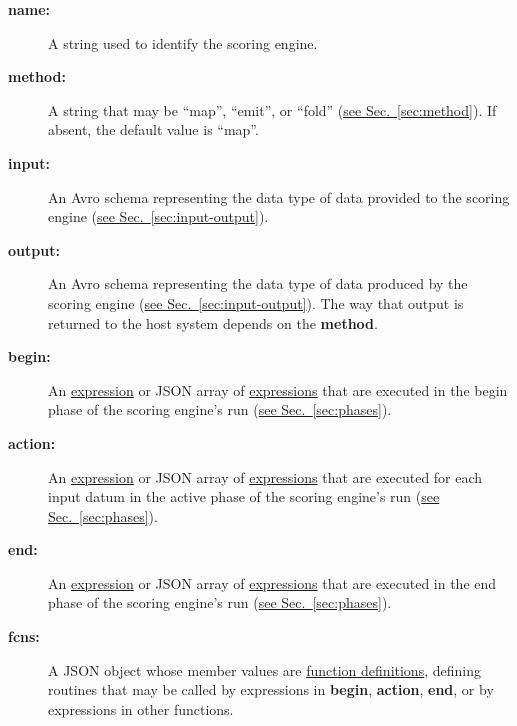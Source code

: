 \documentclass{article}
\newcommand{\PFAc}{\ttfamily\bfseries}
\newenvironment{allowedfields}%
  {\begin{center} \begin{minipage}{0.9\linewidth} \begin{description}}%
  {\end{description} \end{minipage} \end{center}}
\theoremstyle{definition}
\begin{document}
\begin{allowedfields}
\item[\PFAc name:] A string used to identify the scoring engine.
\end{allowedfields}
\begin{allowedfields}
\item[\PFAc method:] A string that may be ``map'', ``emit'', or ``fold'' (\hyperlink{hsec:method}{see Sec.~\ref{sec:method}}).  If absent, the default value is ``map''.
\end{allowedfields}
\begin{allowedfields}
\item[\PFAc input:] An Avro schema representing the data type of data provided to the scoring engine (\hyperlink{hsec:input-output}{see Sec.~\ref{sec:input-output}}).
\end{allowedfields}
\begin{allowedfields}
\item[\PFAc output:] An Avro schema representing the data type of data produced by the scoring engine (\hyperlink{hsec:input-output}{see Sec.~\ref{sec:input-output}}).  The way that output is returned to the host system depends on the {\PFAc method}.
\end{allowedfields}
\begin{allowedfields}
\item[\PFAc begin:] An \hyperlink{hsec:expressions}{expression} or JSON array of \hyperlink{hsec:expressions}{expressions} that are executed in the begin phase of the scoring engine's run (\hyperlink{hsec:phases}{see Sec.~\ref{sec:phases}}).
\end{allowedfields}
\begin{allowedfields}
\item[\PFAc action:] An \hyperlink{hsec:expressions}{expression} or JSON array of \hyperlink{hsec:expressions}{expressions} that are executed for each input datum in the active phase of the scoring engine's run (\hyperlink{hsec:phases}{see Sec.~\ref{sec:phases}}).
\end{allowedfields}
\begin{allowedfields}
\item[\PFAc end:] An \hyperlink{hsec:expressions}{expression} or JSON array of \hyperlink{hsec:expressions}{expressions} that are executed in the end phase of the scoring engine's run (\hyperlink{hsec:phases}{see Sec.~\ref{sec:phases}}).
\end{allowedfields}
\begin{allowedfields}
\item[\PFAc fcns:] A JSON object whose member values are \hyperlink{hsec:fcndef}{function definitions}, defining routines that may be called by expressions in {\PFAc begin}, {\PFAc action}, {\PFAc end}, or by expressions in other functions.
\end{allowedfields}
\end{document}
